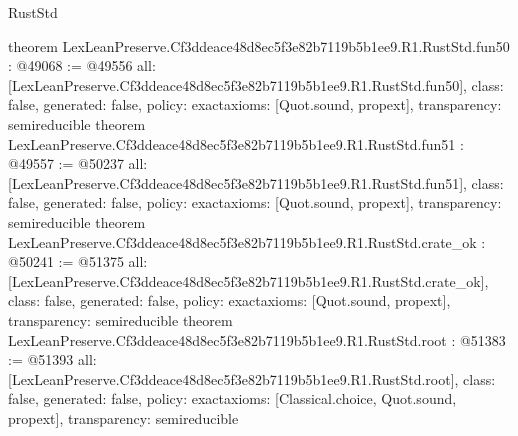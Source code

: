 \begin{lexlean}{RustStd}
\begin{coremodule}
{}
theorem LexLeanPreserve.Cf3ddeace48d8ec5f3e82b7119b5b1ee9.R1.RustStd.fun50 : @49068 := @49556 {
  all: [LexLeanPreserve.Cf3ddeace48d8ec5f3e82b7119b5b1ee9.R1.RustStd.fun50],
  class: false,
  generated: false,
  policy: exact{axioms: [Quot.sound, propext]},
  transparency: semireducible
}
theorem LexLeanPreserve.Cf3ddeace48d8ec5f3e82b7119b5b1ee9.R1.RustStd.fun51 : @49557 := @50237 {
  all: [LexLeanPreserve.Cf3ddeace48d8ec5f3e82b7119b5b1ee9.R1.RustStd.fun51],
  class: false,
  generated: false,
  policy: exact{axioms: [Quot.sound, propext]},
  transparency: semireducible
}
theorem LexLeanPreserve.Cf3ddeace48d8ec5f3e82b7119b5b1ee9.R1.RustStd.crate_ok : @50241 := @51375 {
  all: [LexLeanPreserve.Cf3ddeace48d8ec5f3e82b7119b5b1ee9.R1.RustStd.crate_ok],
  class: false,
  generated: false,
  policy: exact{axioms: [Quot.sound, propext]},
  transparency: semireducible
}
theorem LexLeanPreserve.Cf3ddeace48d8ec5f3e82b7119b5b1ee9.R1.RustStd.root : @51383 := @51393 {
  all: [LexLeanPreserve.Cf3ddeace48d8ec5f3e82b7119b5b1ee9.R1.RustStd.root],
  class: false,
  generated: false,
  policy: exact{axioms: [Classical.choice, Quot.sound, propext]},
  transparency: semireducible
}


\end{coremodule}
\end{lexlean}

